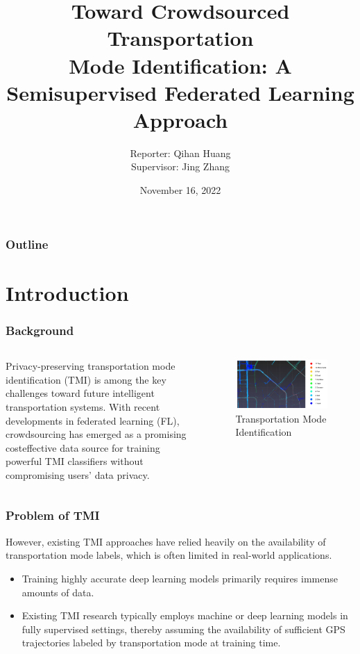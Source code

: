 \documentclass[UTF8]{beamer}
\title[Volume: 9 Issue: 14] %
{Toward Crowdsourced Transportation \\Mode Identification: A Semisupervised Federated Learning Approach}
\author[IEEE Internet of Things Journal] %
{Reporter: Qihan Huang\\  Supervisor: Jing Zhang
}
\date[10.1109/JIOT.2021.3132056]{November 16, 2022}
\begin{document}
\frame{\titlepage}

\begin{frame}
\frametitle{Outline}
\tableofcontents
\end{frame}

\section{Introduction}

\begin{frame}
\frametitle{Background}
\begin{columns}

Privacy-preserving transportation mode identification (TMI) is among the key challenges toward future intelligent transportation systems. With recent developments in federated learning (FL), crowdsourcing has emerged as a promising costeffective data source for training powerful TMI classifiers without compromising users’ data privacy. 


\begin{figure}[ht]
\centering
\includegraphics[width=1\textwidth]{images/tul-cls.png}
\caption{Transportation Mode Identification} 
\end{figure}
\end{columns}

\end{frame}


\begin{frame}
\frametitle{Problem of TMI}
\alert{However, existing TMI approaches have relied heavily on the availability of transportation mode labels, which is often limited in real-world applications.}

\begin{itemize}
 \item Training highly accurate deep learning models primarily requires immense amounts of data.
 \item Existing TMI research typically employs machine or deep learning models in fully supervised settings, thereby assuming the availability of sufficient GPS trajectories labeled by transportation mode at training time.
\end{itemize}

\end{frame}
\end{document}
